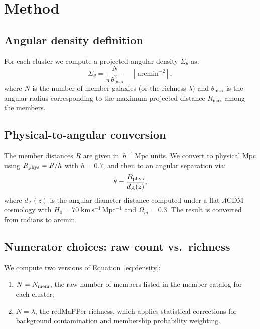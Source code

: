 \documentclass[12pt, letterpaper]{article}
\newcommand{\hmpc}{\,h^{-1}\,\mathrm{Mpc}}
\newcommand{\arcminsq}{\,\mathrm{arcmin}^{-2}}
\newcommand{\lam}{\lambda}
\begin{document}
\section{Method}
\label{sec:method}

\subsection{Angular density definition}

For each cluster we compute a projected angular density
$\Sigma_\theta$ as:
\begin{equation}
    \Sigma_\theta
    = \frac{N}{\pi\,\theta_{\max}^2}
    \quad [\arcminsq],
    \label{eq:density}
\end{equation}
where $N$ is the number of member galaxies (or the richness $\lam$)
and $\theta_{\max}$ is the angular radius corresponding to the maximum
projected distance $R_{\max}$ among the members.

\subsection{Physical-to-angular conversion}

The member distances $R$ are given in $\hmpc$ units.  We convert to
physical Mpc using $R_{\rm phys} = R / h$ with $h = 0.7$, and then to an
angular separation via:
\begin{equation}
    \theta = \frac{R_{\rm phys}}{d_A(z)},
    \label{eq:theta}
\end{equation}
where $d_A(z)$ is the angular diameter distance computed under a flat
$\Lambda$CDM cosmology with $H_0 = 70\;\mathrm{km\,s^{-1}\,Mpc^{-1}}$
and $\Omega_m = 0.3$.  The result is converted from radians to arcmin.

\subsection{Numerator choices: raw count vs.\ richness}

We compute two versions of Equation~\ref{eq:density}:
\begin{enumerate}
    \item $N = N_{\rm mem}$, the raw number of members listed in the
          member catalog for each cluster;
    \item $N = \lam$, the redMaPPer richness, which applies statistical
          corrections for background contamination and membership
          probability weighting.
\end{enumerate}
\end{document}
